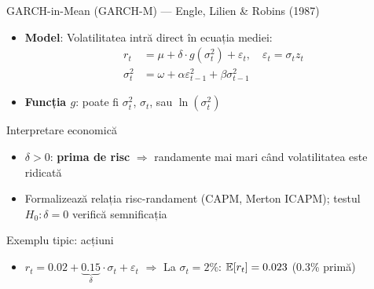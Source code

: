 \documentclass[9pt, aspectratio=169, t]{beamer}
\begin{document}
\begin{frame}{GARCH-in-Mean (GARCH-M) --- Engle, Lilien \& Robins (1987)}
    \small
    \vspace{-0.3cm}
    \begin{defn}[GARCH-M]
        \begin{itemize}
            \item \textbf{Model}: Volatilitatea intră direct în ecuația mediei:
            \vspace{-0.2cm}
            \begin{align*}
                r_t &= \mu + \delta \cdot g(\sigma_t^2) + \varepsilon_t, \quad \varepsilon_t = \sigma_t z_t \\
                \sigma_t^2 &= \omega + \alpha \varepsilon_{t-1}^2 + \beta \sigma_{t-1}^2
            \end{align*}
            \vspace{-0.4cm}
            \item \textbf{Funcția $g$}: poate fi $\sigma_t^2$, $\sigma_t$, sau $\ln(\sigma_t^2)$
        \end{itemize}
    \end{defn}
    \vspace{-0.25cm}
    \begin{block}{Interpretare economică}
        \begin{itemize}
            \item $\delta > 0$: \textbf{prima de risc} $\Rightarrow$ randamente mai mari când volatilitatea este ridicată
            \item Formalizează relația risc-randament (CAPM, Merton ICAPM); testul $H_0: \delta = 0$ verifică semnificația
        \end{itemize}
    \end{block}
    \vspace{-0.15cm}
    \begin{exampleblock}{Exemplu tipic: acțiuni}
        \begin{itemize}
            \item $r_t = 0.02 + \underbrace{0.15}_{\delta} \cdot \sigma_t + \varepsilon_t$ \quad $\Rightarrow$ La $\sigma_t = 2\%$: $\mathbb{E}[r_t] = 0.023$ (0.3\% primă)
        \end{itemize}
    \end{exampleblock}
\end{frame}
\end{document}
